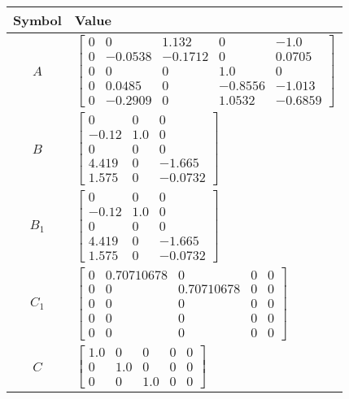 \begin{tabular}{cl}
\hline
  Symbol  & Value                                                                                                                                                                                             \\
\hline
   $A$    & $\left[\begin{matrix}0 & 0 & 1.132 & 0 & -1.0\\0 & -0.0538 & -0.1712 & 0 & 0.0705\\0 & 0 & 0 & 1.0 & 0\\0 & 0.0485 & 0 & -0.8556 & -1.013\\0 & -0.2909 & 0 & 1.0532 & -0.6859\end{matrix}\right]$ \\
   $B$    & $\left[\begin{matrix}0 & 0 & 0\\-0.12 & 1.0 & 0\\0 & 0 & 0\\4.419 & 0 & -1.665\\1.575 & 0 & -0.0732\end{matrix}\right]$                                                                           \\
 $B_{1}$  & $\left[\begin{matrix}0 & 0 & 0\\-0.12 & 1.0 & 0\\0 & 0 & 0\\4.419 & 0 & -1.665\\1.575 & 0 & -0.0732\end{matrix}\right]$                                                                           \\
 $C_{1}$  & $\left[\begin{matrix}0 & 0.70710678 & 0 & 0 & 0\\0 & 0 & 0.70710678 & 0 & 0\\0 & 0 & 0 & 0 & 0\\0 & 0 & 0 & 0 & 0\\0 & 0 & 0 & 0 & 0\end{matrix}\right]$                                          \\
   $C$    & $\left[\begin{matrix}1.0 & 0 & 0 & 0 & 0\\0 & 1.0 & 0 & 0 & 0\\0 & 0 & 1.0 & 0 & 0\end{matrix}\right]$                                                                                            \\

\end{tabular}
